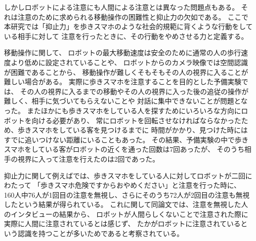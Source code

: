 \documentclass{kuisthesis}
\begin{document}
しかしロボットによる注意にも人間による注意とは異なった問題点もある。
それは注意のために求められる移動操作の困難性と抑止力の欠如である。
ここで本研究では「抑止力」を歩きスマホのような社会的規範に背くような行動をしている相手に対して
注意を行ったときに、その行動をやめさせる力と定義する。

移動操作に関して、
ロボットの最大移動速度は安全のために通常の人の歩行速度より低めに設定されていることや、
ロボットからのカメラ映像では空間認識が困難であることから、
移動操作が難しくそもそもその人の視界に入ることが難しい場合がある。
実際に歩きスマホを注意することを目的とした予備実験では、%
その人の視界に入るまでの移動やその人の視界に入った後の追従の操作が難しく、相手に気づいてもらえないことや
対話に集中できないことが問題となった。
またほかにも歩きスマホをしている人を探すためにいろいろな方向にロボットを向ける必要があり、
常にロボットを回転させなければならなかったため、歩きスマホをしている客を見つけるまでに
時間がかかり、見つけた時にはすでに追いつけない距離にいることもあった。
その結果、予備実験の中で歩きスマホをしている客がロボットの近くを通った回数は7回あったが、
そのうち相手の視界に入って注意を行えたのは2回であった。

抑止力に関して例えば\cite{Schneider2022}では、歩きスマホをしている人に対してロボットが二回にわたって
「歩きスマホ危険ですからおやめください」と注意を行った時に、
160人中76人が1回目の注意を無視し、さらにそのうち72人が2回目の注意も無視したという結果が得られている。
これに関して同論文では、注意を無視した人のインタビューの結果から、
ロボットが人間らしくないことで注意された際に実際に人間に注意されているとは感じず、
たかがロボットに注意されているという認識を持つことが多いためであると考察されている。
\end{document}
